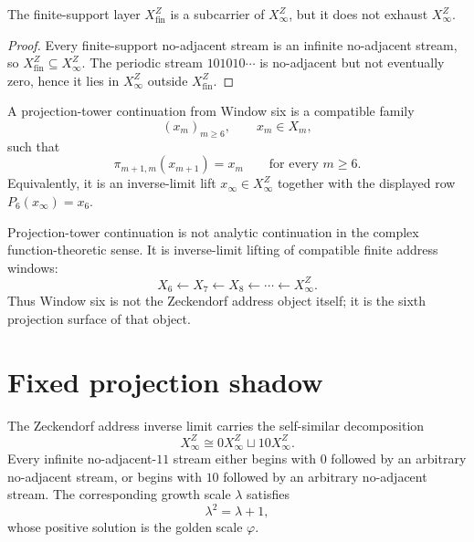 \begin{proposition}
\label{prop:axiszeckendorf-address-larger-than-number-notation}
The finite-support layer $X_{\mathrm{fin}}^Z$ is a subcarrier of
$X_\infty^Z$, but it does not exhaust $X_\infty^Z$.
\end{proposition}

\begin{proof}
Every finite-support no-adjacent stream is an infinite no-adjacent stream,
so $X_{\mathrm{fin}}^Z\subseteq X_\infty^Z$.  The periodic stream
$101010\cdots$ is no-adjacent but not eventually zero, hence it lies in
$X_\infty^Z$ outside $X_{\mathrm{fin}}^Z$.
\end{proof}

\begin{definition}
\label{def:axiszeckendorf-projection-tower-continuation}
A projection-tower continuation from Window six is a compatible family
$$
(x_m)_{m\geq 6},
\qquad
x_m\in X_m,
$$
such that
$$
\pi_{m+1,m}(x_{m+1})=x_m
\qquad
\text{for every }m\geq 6.
$$
Equivalently, it is an inverse-limit lift $x_\infty\in X_\infty^Z$ together
with the displayed row $P_6(x_\infty)=x_6$.
\end{definition}

\begin{principle}
\label{prin:axiszeckendorf-continuation-not-analytic}
Projection-tower continuation is not analytic continuation in the complex
function-theoretic sense.  It is inverse-limit lifting of compatible finite
address windows:
$$
X_6\leftarrow X_7\leftarrow X_8\leftarrow\cdots\leftarrow X_\infty^Z.
$$
Thus Window six is not the Zeckendorf address object itself; it is the
sixth projection surface of that object.
\end{principle}

\section{Fixed projection shadow}
\label{sec:axiszeckendorf-fixed-projection-shadow}

\begin{definition}
\label{def:axiszeckendorf-golden-mean-self-similar-object}
The Zeckendorf address inverse limit carries the self-similar decomposition
$$
X_\infty^Z
\cong
0X_\infty^Z\sqcup 10X_\infty^Z.
$$
Every infinite no-adjacent-$11$ stream either begins with $0$ followed by an
arbitrary no-adjacent stream, or begins with $10$ followed by an arbitrary
no-adjacent stream.  The corresponding growth scale $\lambda$ satisfies
$$
\lambda^2=\lambda+1,
$$
whose positive solution is the golden scale $\varphi$.
\end{definition}

